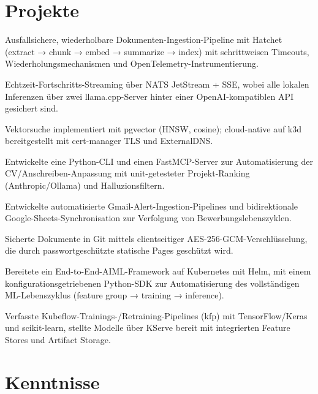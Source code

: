 \documentclass[10pt,a4paper]{resume}
\begin{document}
\section{Projekte}

\bullets
  \item Ausfallsichere, wiederholbare Dokumenten-Ingestion-Pipeline mit Hatchet (extract → chunk → embed → summarize → index) mit schrittweisen Timeouts, Wiederholungsmechanismen und OpenTelemetry-Instrumentierung.
  \item Echtzeit-Fortschritts-Streaming über NATS JetStream + SSE, wobei alle lokalen Inferenzen über zwei llama.cpp-Server hinter einer OpenAI-kompatiblen API gesichert sind.
  \item Vektorsuche implementiert mit pgvector (HNSW, cosine); cloud-native auf k3d bereitgestellt mit cert-manager TLS und ExternalDNS.
\bulletsend
\vspace{1.0pt}
\bullets
  \item Entwickelte eine Python-CLI und einen FastMCP-Server zur Automatisierung der CV/Anschreiben-Anpassung mit unit-getesteter Projekt-Ranking (Anthropic/Ollama) und Halluzionsfiltern.
  \item Entwickelte automatisierte Gmail-Alert-Ingestion-Pipelines und bidirektionale Google-Sheets-Synchronisation zur Verfolgung von Bewerbungslebenszyklen.
  \item Sicherte Dokumente in Git mittels clientseitiger AES-256-GCM-Verschlüsselung, die durch passwortgeschützte statische Pages geschützt wird.
\bulletsend
\vspace{1.0pt}
\bullets
  \item Bereitete ein End-to-End-AIML-Framework auf Kubernetes mit Helm, mit einem konfigurationsgetriebenen Python-SDK zur Automatisierung des vollständigen ML-Lebenszyklus (feature group → training → inference).
  \item Verfasste Kubeflow-Trainings-/Retraining-Pipelines (kfp) mit TensorFlow/Keras und scikit-learn, stellte Modelle über KServe bereit mit integrierten Feature Stores und Artifact Storage.
\bulletsend

\section{Kenntnisse}
\end{document}
